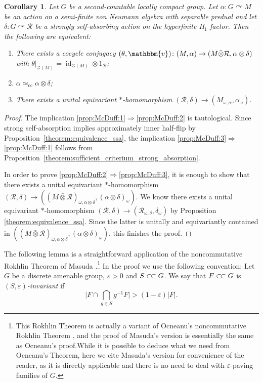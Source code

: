 \documentclass[11pt,a4paper]{article}
\newtheorem{corollary}[theorem]{Corollary}
\theoremstyle{definition}
\theoremstyle{remark}
\numberwithin{equation}{section}
\numberwithin{theorem}{section}
\newcommand{\acts}{\curvearrowright}
\newcommand{\e}{\varepsilon}
\newcommand{\ssubset}{\subset\joinrel\subset}
\begin{document}
\begin{corollary} \label{cor:equivalence_equivariant_McDuff}
Let $G$ be a second-countable locally compact group.
Let $\alpha:G \acts M$ be an action on a semi-finite von Neumann algebra with separable predual and let $\delta:G \acts \mathcal{R}$ be a strongly self-absorbing action on the hyperfinite II$_1$ factor.
Then the following are equivalent:
\begin{enumerate}[leftmargin=*,label=\textup{(\arabic*)}]
\item There exists a cocycle conjugacy $(\theta,\mathbbm{v})\colon (M,\alpha) \to (M\bar{\otimes}\mathcal{R},\alpha \otimes \delta)$ with $\theta|_{\mathcal{Z}(M)}=\operatorname{id}_{\mathcal{Z}(M)}\otimes 1_{\mathcal R}$; \label{prop:McDuff:1}
\item $\alpha \simeq_{\mathrm{cc}} \alpha \otimes \delta$; \label{prop:McDuff:2}
\item There exists a unital equivariant $*$-homomorphism $(\mathcal{R},\delta) \rightarrow (M_{\omega,\alpha}, \alpha_\omega)$. \label{prop:McDuff:3}
\end{enumerate}
\end{corollary}
%
\begin{proof}
The implication \ref{prop:McDuff:1}$\Rightarrow$\ref{prop:McDuff:2} is tautological.
Since strong self-absorption implies approximately inner half-flip by Proposition~\ref{theorem:equivalence_ssa}, the implication \ref{prop:McDuff:3}$\Rightarrow$\ref{prop:McDuff:1} follows from Proposition~\ref{theorem:sufficient_criterium_strong_absorption}.

In order to prove \ref{prop:McDuff:2}$\Rightarrow$\ref{prop:McDuff:3}, it is enough to show that there exists a unital equivariant $*$-homomorphism $(\mathcal{R}, \delta) \rightarrow ((M \bar{\otimes} \mathcal{R})_{\omega,\alpha \otimes \delta}, (\alpha \otimes \delta)_\omega)$.
We know there exists a unital equivariant $*$-homomorphism $(\mathcal{R}, \delta) \rightarrow (\mathcal{R}_{\omega,\delta}, \delta_\omega)$ by Proposition \ref{theorem:equivalence_ssa}.
Since the latter is unitally and equivariantly contained in $((M \bar{\otimes} \mathcal{R})_{\omega,\alpha \otimes \delta}, (\alpha \otimes \delta)_\omega)$, this finishes the proof.
\end{proof}

The following lemma is a straightforward application of the noncommutative Rokhlin Theorem of Masuda \cite[Theorem 4.8]{Masuda13}.\footnote{This Rokhlin Theorem is actually a variant of Ocneanu's noncommutative Rokhlin Theorem \cite[Theorem 6.1]{Ocneanu85}, and the proof of Masuda's version is essentially the same as Ocneanu's proof.While it is possible to deduce what we need from Ocneanu's Theorem, here we cite Masuda's version for convenience of the reader, as it is directly applicable and there is no need to deal with $\e$-paving families of $G$.}
In the proof we use the following convention: Let $G$ be a discrete amenable group, $\e >0$ and $S \ssubset G$.
We say that $F \ssubset G$ is \emph{$(S,\e)$-invariant} if 
\[
\Big \lvert F \cap \bigcap_{g \in S} g^{-1}F\Big \rvert > (1-\e) |F|.
\]
\end{document}
